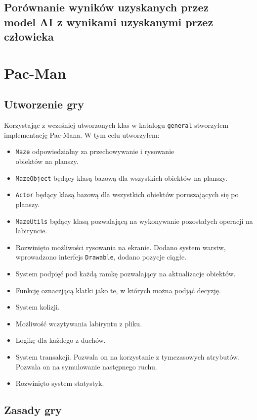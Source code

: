 \documentclass[12pt, draft]{report}
\begin{document}
\section{Porównanie wyników uzyskanych przez \\ model AI z wynikami uzyskanymi przez człowieka}

\chapter{Pac-Man}

\section{Utworzenie gry}
Korzystając z wcześniej utworzonych klas w katalogu \texttt{general} stworzyłem implementację Pac-Mana.
W tym celu utworzyłem:
\begin{itemize}
    \item \texttt{Maze} odpowiedzialny za przechowywanie i rysowanie \\ obiektów na planszy.
    \item \texttt{MazeObject} będący klasą bazową dla wszystkich obiektów na planszy.
    \item \texttt{Actor} będący klasą bazową dla wszystkich obiektów poruszających się po planszy.
    \item \texttt{MazeUtils} będący klasą pozwalającą na wykonywanie pozostałych operacji na labiryncie.
    \item Rozwinięto możliwości rysowania na ekranie. Dodano system warstw, wprowadzono interfejs \texttt{Drawable}, dodano pozycje ciągłe.
    \item System podpięć pod każdą ramkę pozwalający na aktualizacje obiektów.
    \item Funkcję oznaczjącą klatki jako te, w których można podjąć decyzję.
    \item System kolizji.
    \item Możliwość wczytywania labiryntu z pliku.
    \item Logikę dla każdego z duchów.
    \item System transakcji. Pozwala on na korzystanie z tymczasowych atrybutów. Pozwala on na symulowanie następnego ruchu.
    \item Rozwinięto system statystyk.
\end{itemize}

\section{Zasady gry}
\end{document}
